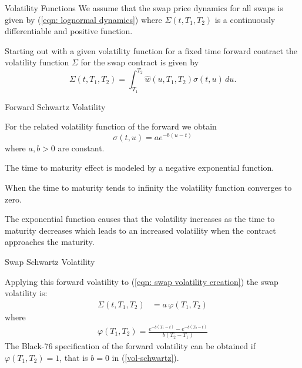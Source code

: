 


{Volatility Functions}
We assume that the swap price dynamics for all swaps is given by (\ref{eqn: lognormal dynamics})
where $\Sigma(t,T_1,T_2)$ is a continuously differentiable and positive function.

Starting out with a given volatility function for a fixed time forward contract the volatility function $\Sigma$ for the swap contract is given by
\begin{equation}
\Sigma(t,T_1,T_2)=\int_{T_1}^{T_2} \hat{w}(u,T_1,T_2) \sigma(t,u) \, du. \label{eqn: swap volatility creation}
\end{equation}

{Forward Schwartz Volatility}






	For the related volatility function of the forward we obtain
\begin{equation}\label{vol-schwartz}
\sigma(t,u)=a e^{-b(u-t)}
\end{equation}
where $a,b >0 $ are constant.


	
The time to maturity effect is modeled by a negative exponential function.






	When the time to maturity tends to infinity the volatility function converges to zero.


	The exponential function causes that the volatility increases as the time to maturity decreases which leads to an increased volatility when the contract approaches the maturity.









{Swap Schwartz Volatility}

Applying this forward volatility to (\ref{eqn: swap volatility creation}) the swap volatility is:
\begin{align}
\Sigma(t,T_1,T_2)&=a\,\varphi(T_1,T_2)
\end{align}
where
\begin{align}
\varphi(T_1,T_2)= \frac{e^{-b(T_1-t)}-e^{-b(T_2-t)}}{b(T_2-T_1)}
\label{volatility function varphi}
\end{align}
The Black-76 specification of the forward volatility can be obtained if $\varphi(T_1,T_2) =1$, that is $b=0$
in (\ref{vol-schwartz}).

